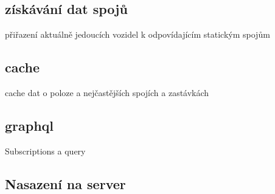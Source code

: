 \subsection {získávání dat spojů}
přiřazení aktuálně jedoucích vozidel k odpovídajícím statickým spojům
\subsection {cache}
cache dat o poloze a nejčastějších spojích a zastávkách
\subsection {graphql}
Subscriptions a query
\subsection{Nasazení na server}

